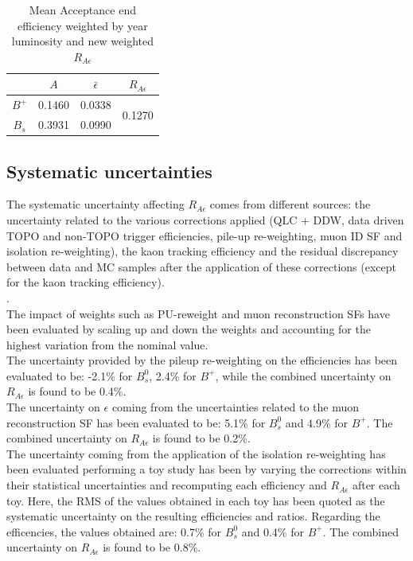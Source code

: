 \begin{table}[h]
    \centering
    \begin{tabular}{|c|c|c|c|}\hline
      &   $A$  & $\bar{\epsilon}$& $R_{A \epsilon}$\\\hline
    $B^+$&  0.1460& 0.0338& \multirow{2}{*}{0.1270}\\
    $B_s$&  0.3931& 0.0990&  \\\hline
    \end{tabular}
    \caption{Mean Acceptance end efficiency weighted by year luminosity and new weighted $R_{A \epsilon}$}
    \label{table:mean eff and new ratio}
\end{table}



\subsection{Systematic uncertainties}
\label{section:syst on eff ratio}

The systematic uncertainty affecting $R_{A\epsilon}$ comes from different sources: the uncertainty related to the various corrections applied (QLC + DDW, data driven TOPO and non-TOPO trigger efficiencies, pile-up re-weighting, muon ID SF and isolation re-weighting), the kaon tracking efficiency and the residual discrepancy between data and MC samples after the application of these corrections (except for the kaon tracking efficiency).\\

\noindent
{}.\\

\noindent
The impact of weights such as PU-reweight and muon reconstruction SFs have been evaluated by scaling up and down the weights and accounting for the highest variation from the nominal value.\\
The uncertainty provided by the pileup re-weighting on the efficiencies has been evaluated to be: -2.1\% for $B^0_s$, 2.4\% for $B^+$, while the combined uncertainty on $R_{A\epsilon}$ is found to be 0.4\%.\\
The uncertainty on $\epsilon$ coming from the uncertainties related to the muon reconstruction SF has been evaluated to be: 5.1\% for $B^0_s$ and 4.9\% for $B^+$. The combined uncertainty on $R_{A\epsilon}$ is found to be 0.2\%.\\

\noindent
The uncertainty coming from the application of the isolation re-weighting has been evaluated performing a toy study has been by varying the corrections within their statistical uncertainties and recomputing each efficiency and $R_{A\epsilon}$ after each toy. Here, the RMS of the values obtained in each toy has been quoted as the systematic uncertainty on the resulting efficiencies and ratios. Regarding the efficencies, the values obtained are: 0.7\% for $B^0_s$ and 0.4\% for $B^+$. The combined uncertainty on $R_{A\epsilon}$ is found to be 0.8\%. \\

